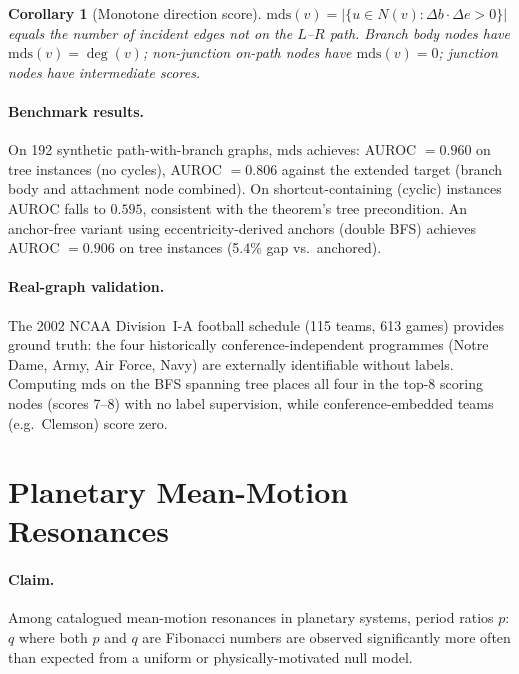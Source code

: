 \documentclass[11pt]{article}
\newtheorem{corollary}[definition]{Corollary}
\begin{document}
\begin{corollary}[Monotone direction score]\label{cor:mds}
$\mathrm{mds}(v) = |\{u \in N(v) : \Delta b \cdot \Delta e > 0\}|$ equals the number of
incident edges not on the $L$--$R$ path.  Branch body nodes have $\mathrm{mds}(v) = \deg(v)$;
non-junction on-path nodes have $\mathrm{mds}(v) = 0$; junction nodes have intermediate scores.
\end{corollary}

\paragraph{Benchmark results.}
On 192 synthetic path-with-branch graphs, $\mathrm{mds}$ achieves:
AUROC $= 0.960$ on tree instances (no cycles), AUROC $= 0.806$ against
the extended target (branch body and attachment node combined).
On shortcut-containing (cyclic) instances AUROC falls to $0.595$, consistent
with the theorem's tree precondition.
An anchor-free variant using eccentricity-derived anchors (double BFS)
achieves AUROC $= 0.906$ on tree instances (5.4\% gap vs.\ anchored).

\paragraph{Real-graph validation.}
The 2002 NCAA Division~I-A football schedule (115 teams, 613 games) provides
ground truth: the four historically conference-independent programmes
(Notre Dame, Army, Air Force, Navy) are externally identifiable without labels.
Computing $\mathrm{mds}$ on the BFS spanning tree places all four in the top-8
scoring nodes (scores 7--8) with no label supervision, while conference-embedded
teams (e.g.\ Clemson) score zero.

\section{Planetary Mean-Motion Resonances}\label{sec:planetary}

\paragraph{Claim.}
Among catalogued mean-motion resonances in planetary systems,
period ratios $p$:$q$ where both $p$ and $q$ are Fibonacci numbers
are observed significantly more often than expected from a uniform or
physically-motivated null model.
\end{document}
